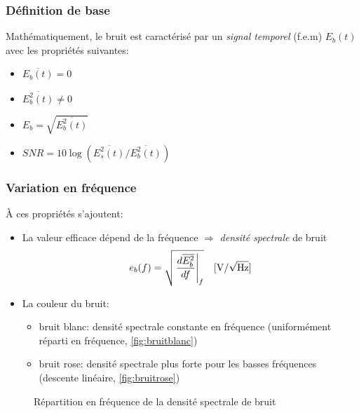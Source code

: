 \subsubsection{Définition de base}
Mathématiquement, le bruit est caractérisé par un \emph{signal temporel} (f.e.m) \(E_b(t)\) avec les propriétés suivantes:
\begin{itemize}
	\item { \(\overline{E_b(t)}=0\)}
	\item { \(\overline{E_b^2(t)} \neq 0\)}
	\item { \(E_b=\sqrt{\overline{E_b^2(t)}}\)}
	\item { \(SNR=10\log\left(\overline{E^2_s(t)}/\overline{E_b^2(t)}\right)\)}
\end{itemize}
\subsubsection{Variation en fréquence}
À ces propriétés s'ajoutent:\begin{itemize}
	\item La valeur efficace dépend de la fréquence \(\Rightarrow\) \emph{densité spectrale} de bruit \[e_b(f)=\sqrt{\left.\frac{d\overline{E_b^2}}{df}\right|_f}\quad [\si[per-mode=symbol]{\volt\per\sqrt{\hertz}}]\]
	\item La couleur du bruit:
	\begin{itemize}
		\item bruit blanc: densité spectrale constante en fréquence (uniformément réparti en fréquence, \autoref{fig:bruitblanc})
		\item bruit rose: densité spectrale plus forte pour les basses fréquences (descente linéaire, \autoref{fig:bruitrose})
	\end{itemize}
\end{itemize}
\begin{figure}[H]
	\centering
	\caption{Répartition en fréquence de la densité spectrale de bruit}
\end{figure}
